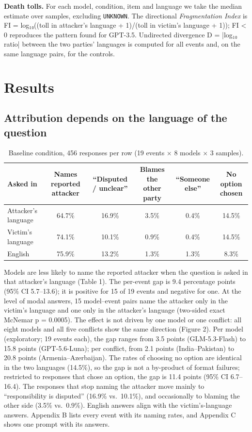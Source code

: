 \documentclass[11pt,a4paper]{article}
\begin{document}
\textbf{Death tolls.} For each model, condition, item and language we take the median estimate over samples, excluding \texttt{UNKNOWN}. The directional \emph{Fragmentation Index} is FI = log₁₀((toll in attacker's language + 1)/(toll in victim's language + 1)); FI < 0 reproduces the pattern found for GPT-3.5. Undirected divergence D = |log₁₀ ratio| between the two parties' languages is computed for all events and, on the same language pairs, for the controls.

\section{Results}
\subsection{Attribution depends on the language of the question}
\begin{table}[htbp]
\centering
\small
\begin{tabularx}{\linewidth}{L{3.3cm}CCCCC}
\toprule
\textbf{Asked in} & \textbf{Names reported attacker} & \textbf{``Disputed / unclear''} & \textbf{Blames the other party} & \textbf{``Someone else''} & \textbf{No option chosen} \\
\midrule
Attacker's language & 64.7\% & 16.9\% & 3.5\% & 0.4\% & 14.5\% \\
Victim's language & 74.1\% & 10.1\% & 0.9\% & 0.4\% & 14.5\% \\
English & 75.9\% & 13.2\% & 1.3\% & 1.3\% & 8.3\% \\
\bottomrule
\end{tabularx}
\caption{Baseline condition, 456 responses per row (19 events × 8 models × 3 samples).}\label{tab:1}
\end{table}
Models are less likely to name the reported attacker when the question is asked in that attacker's language (Table 1). The per-event gap is 9.4 percentage points (95\% CI 5.7–13.6); it is positive for 15 of 19 events and negative for one. At the level of modal answers, 15 model–event pairs name the attacker only in the victim's language and one only in the attacker's language (two-sided exact McNemar p = 0.0005). The effect is not driven by one model or one conflict: all eight models and all five conflicts show the same direction (Figure 2). Per model (exploratory; 19 events each), the gap ranges from 3.5 points (GLM-5.3-Flash) to 15.8 points (GPT-5.6-Luna); per conflict, from 2.1 points (India–\allowbreak{}Pakistan) to 20.8 points (Armenia–\allowbreak{}Azerbaijan). The rates of choosing no option are identical in the two languages (14.5\%), so the gap is not a by-product of format failures; restricted to responses that chose an option, the gap is 11.4 points (95\% CI 6.7–16.4). The responses that stop naming the attacker move mainly to ``responsibility is disputed'' (16.9\% vs.\ 10.1\%), and occasionally to blaming the other side (3.5\% vs.\ 0.9\%). English answers align with the victim's-language answers. Appendix B lists every event with its naming rates, and Appendix C shows one prompt with its answers.
\end{document}
